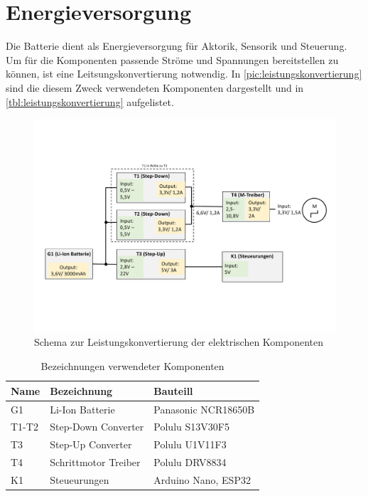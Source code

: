 \newpage

\section{Energieversorgung}
Die Batterie dient als Energieversorgung für Aktorik, Sensorik und Steuerung. Um für die Komponenten passende Ströme und Spannungen bereitstellen zu können, ist eine Leitsungskonvertierung notwendig. In \autoref{pic:leistungskonvertierung} sind die diesem Zweck verwendeten Komponenten dargestellt und in \autoref{tbl:leistungskonvertierung} aufgelistet. 

\begin{figure}[h]
	\begin{center}
		\includegraphics[width=15cm]{leistungskonvertierung.pdf}
		\caption{Schema zur Leistungskonvertierung der elektrischen Komponenten}
		\label{pic:leistungskonvertierung}
	\end{center}
\end{figure}


\begin{table}
	\begin{center}
		\begin{tabular}[h]{l|l|l}
			\textbf{Name} & \textbf{Bezeichnung} & \textbf{Bauteill}\\
			\hline
			G1 & Li-Ion Batterie & Panasonic NCR18650B\\
			\hline
			T1-T2 & Step-Down Converter & Polulu S13V30F5\\
			\hline
			T3 & Step-Up Converter & Polulu U1V11F3\\
			\hline
			T4 & Schrittmotor Treiber & Polulu DRV8834 \\
			\hline
			K1 & Steueurungen & Arduino Nano, ESP32 \\
		\end{tabular}
	\end{center}
	\caption{Bezeichnungen verwendeter Komponenten}
	\label{tbl:leistungskonvertierung}
\end{table}

